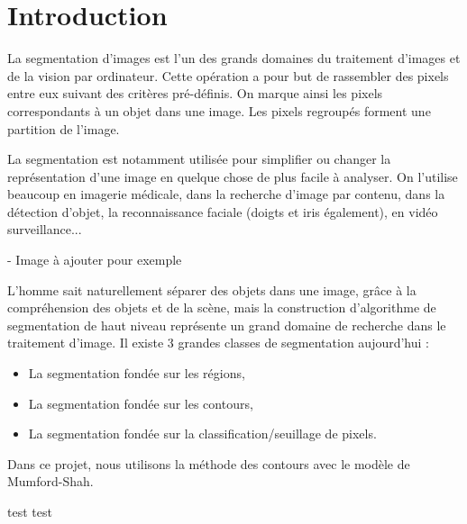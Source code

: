 \section{Introduction}
La segmentation d'images est l'un des grands domaines du traitement d'images et de la vision par ordinateur. Cette opération a pour but de rassembler des pixels entre eux suivant des critères pré-définis. On marque ainsi les pixels correspondants à un objet dans une image. Les pixels regroupés forment une partition de l'image.

\bigskip

La segmentation est notamment utilisée pour simplifier ou changer la représentation d'une image en quelque chose de plus facile à analyser. On l'utilise beaucoup en imagerie médicale, dans la recherche d'image par contenu, dans la détection d'objet, la reconnaissance faciale (doigts et iris également), en vidéo surveillance...

- Image à ajouter pour exemple 

\bigskip

L'homme sait naturellement séparer des objets dans une image, grâce à la compréhension des objets et de la scène,
mais la construction d'algorithme de segmentation de haut niveau représente un grand domaine de recherche dans le traitement d'image. 
Il existe 3 grandes classes de segmentation aujourd'hui :
\begin{itemize}
\item La segmentation fondée sur les régions,
\item La segmentation fondée sur les contours,
\item La segmentation fondée sur la classification/seuillage de pixels.
\end{itemize}


Dans ce projet, nous utilisons la méthode des contours avec le modèle de Mumford-Shah.

test test 
